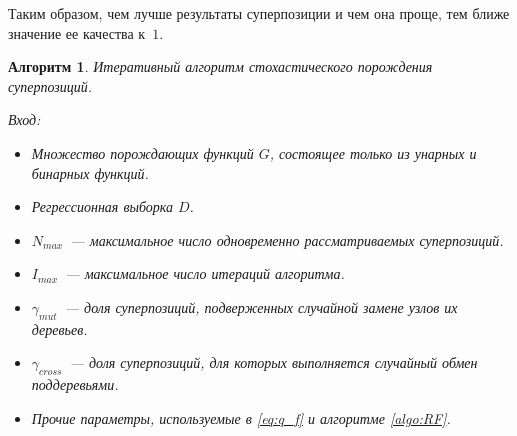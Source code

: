 \documentclass[12pt,a4paper]{article}
\newtheorem{algo}{Алгоритм}
\begin{document}
Таким образом, чем лучше результаты суперпозиции и чем она проще, тем ближе значение ее
качества к~$1$.

\begin{algo}
  \label{algo:SA}
  Итеративный алгоритм стохастического порождения суперпозиций.

  Вход:
  \begin{itemize}
	\item Множество порождающих функций $G$, состоящее только из унарных
	  и бинарных функций.
	\item Регрессионная выборка $D$.
	\item $N_{max}$~--- максимальное число одновременно рассматриваемых
	  суперпозиций.
	\item $I_{max}$~--- максимальное число итераций алгоритма.
	\item $\gamma_{mut}$~--- доля суперпозиций, подверженных случайной
	  замене узлов их деревьев.
	\item $\gamma_{cross}$~--- доля суперпозиций, для которых выполняется
	  случайный обмен поддеревьями.
	\item Прочие параметры, используемые в \eqref{eq:q_f} и алгоритме
	  \ref{algo:RF}.
  \end{itemize}
\end{algo}
\end{document}
